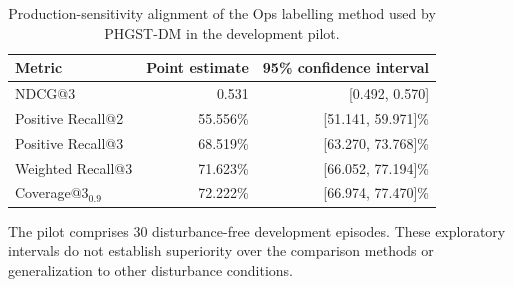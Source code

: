 \begin{table}[!htbp]

\centering
\caption{Production-sensitivity alignment of the Ops labelling method used by PHGST-DM in the development pilot.}
\label{tab:oracle-pilot-ci}
\footnotesize
\setlength{\tabcolsep}{8pt}

\renewcommand{\arraystretch}{1.1}
\begin{tabular*}{\linewidth}{@{\extracolsep{\fill}}lrr@{}}
\toprule
Metric & Point estimate & 95\% confidence interval \\

\midrule
NDCG@3 & 0.531 & [0.492, 0.570] \\
Positive Recall@2 & 55.556\% & [51.141, 59.971]\% \\
Positive Recall@3 & 68.519\% & [63.270, 73.768]\% \\
Weighted Recall@3 & 71.623\% & [66.052, 77.194]\% \\
Coverage@3$_{0.9}$ & 72.222\% & [66.974, 77.470]\% \\
\bottomrule
\end{tabular*}
\par\vspace{3pt}
\begin{minipage}{\linewidth}
\footnotesize
The pilot comprises 30 disturbance-free development episodes. These exploratory intervals do not establish superiority over the comparison methods or generalization to other disturbance conditions.
\end{minipage}
\end{table}

